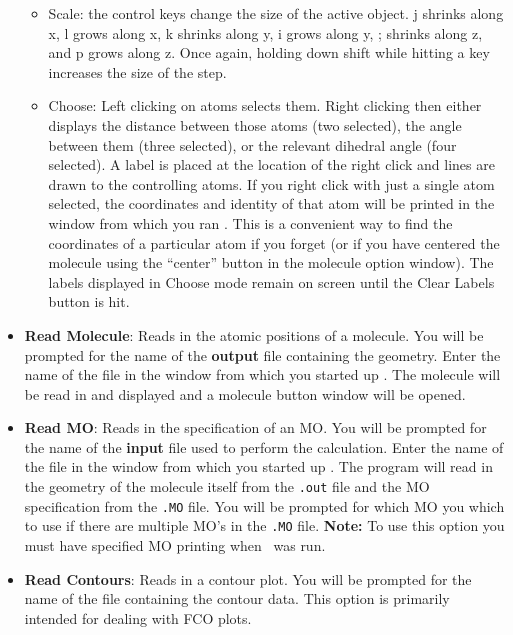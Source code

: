 \begin{itemize}
\begin{itemize}
\item Scale: the control keys change the size of the active object. 
j shrinks along x, l grows along x, k shrinks along y, i grows along
y, ; shrinks along z, and p grows along z.  Once again, holding down
shift while hitting a key increases the size of the step.

\item Choose: Left clicking on atoms selects them.  Right clicking
then either displays the distance between those atoms (two selected),
the angle between them (three selected), or the relevant dihedral
angle (four selected).  A label is placed at the location
of the right click and lines are drawn to the controlling atoms.  If
you right click with just a single atom selected, the coordinates and
identity of that atom will be printed in the window from which you ran
\viewprog.  This is a convenient way to find the coordinates of a
particular atom if you forget (or if you have centered the molecule
using the ``center'' button in the molecule option window).
The labels displayed in Choose mode remain on screen until the {\sf
Clear Labels} button is 
hit.  

\end{itemize}

\item {\bf Read Molecule}:  Reads in the atomic positions of a
molecule.  You will be prompted for the name of the {\bf output} file
containing the geometry.  Enter the name of the file in the window
from which you started up \viewprog.  The molecule will be read in and
displayed and a molecule button window will be opened.

\item {\bf Read MO}: Reads in the specification of an MO.  You will be
prompted for the name of the {\bf input} file used to perform the
calculation. Enter the name of the file in the window from which you
started up \viewprog.  The program will read in the geometry of the
molecule itself from the {\tt .out} file and the MO specification from
the {\tt .MO} file.  You will be prompted for which MO you which to
use if there are multiple MO's in the {\tt .MO} file.  {\bf Note:}  To
use this option you must have specified MO printing when \calcprog\
was run.   

\item {\bf Read Contours}:  Reads in a contour plot.  You will be
prompted for the name of the file containing the contour data.
This option is primarily intended for dealing with FCO plots.


\end{itemize}
